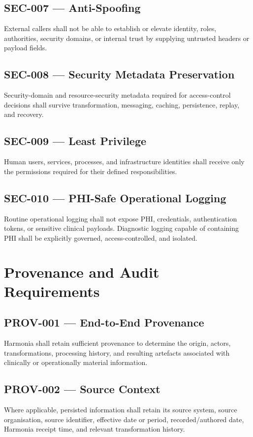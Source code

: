 \subsection{SEC-007 --- Anti-Spoofing}
External callers shall not be able to establish or elevate identity, roles, authorities, security domains, or internal trust by supplying untrusted headers or payload fields.

\subsection{SEC-008 --- Security Metadata Preservation}
Security-domain and resource-security metadata required for access-control decisions shall survive transformation, messaging, caching, persistence, replay, and recovery.

\subsection{SEC-009 --- Least Privilege}
Human users, services, processes, and infrastructure identities shall receive only the permissions required for their defined responsibilities.

\subsection{SEC-010 --- PHI-Safe Operational Logging}
Routine operational logging shall not expose PHI, credentials, authentication tokens, or sensitive clinical payloads. Diagnostic logging capable of containing PHI shall be explicitly governed, access-controlled, and isolated.

\section{Provenance and Audit Requirements}

\subsection{PROV-001 --- End-to-End Provenance}
Harmonia shall retain sufficient provenance to determine the origin, actors, transformations, processing history, and resulting artefacts associated with clinically or operationally material information.

\subsection{PROV-002 --- Source Context}
Where applicable, persisted information shall retain its source system, source organisation, source identifier, effective date or period, recorded/authored date, Harmonia receipt time, and relevant transformation history.

